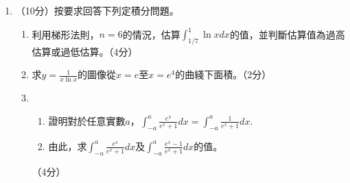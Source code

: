 \documentclass[12pt]{article}
\begin{document}
\begin{enumerate}
        \hrulefill
        \item （10分）按要求回答下列定積分問題。\begin{enumerate}
            \item 利用梯形法則，$n=6$的情況，估算$\displaystyle \int_{1/7}^1 \ln{x} dx$的值，並判斷估算值為過高估算或過低估算。\hfill（4分）
            \item 求$\displaystyle y=\frac{1}{x\ln{x}}$的圖像從$x=e$至$x=e^4$的曲綫下面積。\hfill（2分）
            \item \begin{enumerate}
                \item 證明對於任意實數$a$，$\displaystyle\int_{-a}^{a}\frac{e^{x}}{e^{x}+1}dx=\int_{-a}^{a}\frac{1}{e^{x}+1}dx$.
                \item 由此，求$\displaystyle\int_{-a}^{a}\frac{e^{x}}{e^{x}+1}dx$及$\displaystyle\int_{-a}^{a}\frac{e^{x}-1}{e^{x}+1}dx$的值。
            \end{enumerate}\hfill（4分）
        \end{enumerate}

        \hrulefill

        \hrulefill

        \hrulefill

        \hrulefill

        \hrulefill

        \hrulefill

        \hrulefill

        \hrulefill

        \hrulefill

        \hrulefill

        \hrulefill

        \hrulefill

        \hrulefill

        \hrulefill

        \hrulefill

        \hrulefill

        \hrulefill

        \hrulefill

        \hrulefill

        \hrulefill

        \hrulefill

        \hrulefill

        \hrulefill

        \hrulefill

        \hrulefill


\end{enumerate}
\end{document}

